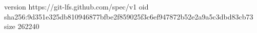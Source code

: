 version https://git-lfs.github.com/spec/v1
oid sha256:9d351e325db810946877bfbe2f859025f3c6ef947872b52e2a9a5c3dbd83cb73
size 262240
